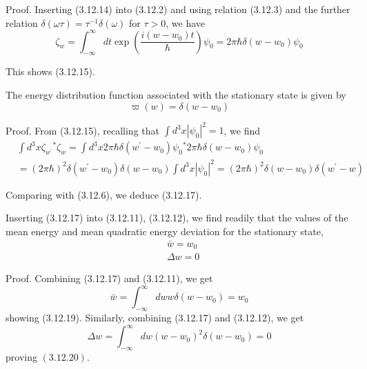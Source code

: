 \documentclass{article}
\begin{document}
Proof. Inserting (3.12.14) into (3.12.2) and using relation (3.12.3) and the further relation $\delta(\omega \tau)=\tau^{-1} \delta(\omega)$ for $\tau>0$, we have
$$
\begin{equation*}
\zeta_{w}=\int_{-\infty}^{\infty} d t \exp \left(\frac{i\left(w-w_{0}\right) t}{\hbar}\right) \psi_{0}=2 \pi \hbar \delta\left(w-w_{0}\right) \psi_{0} \tag{3.12.16}
\end{equation*}
$$

This shows (3.12.15).

The energy distribution function associated with the stationary state is given by
$$
\begin{equation*}
\varpi(w)=\delta\left(w-w_{0}\right) \tag{3.12.17}
\end{equation*}
$$

Proof. From (3.12.15), recalling that $\int d^{3} x\left|\psi_{0}\right|^{2}=1$, we find
$$
\begin{align*}
& \int d^{3} x \zeta_{w^{\prime}}{ }^{*} \zeta_{w}=\int d^{3} x 2 \pi \hbar \delta\left(w^{\prime}-w_{0}\right) \psi_{0}{ }^{*} 2 \pi \hbar \delta\left(w-w_{0}\right) \psi_{0}  \tag{3.12.18}\\
& =(2 \pi \hbar)^{2} \delta\left(w^{\prime}-w_{0}\right) \delta\left(w-w_{0}\right) \int d^{3} x\left|\psi_{0}\right|^{2}=(2 \pi \hbar)^{2} \delta\left(w-w_{0}\right) \delta\left(w^{\prime}-w\right)
\end{align*}
$$

Comparing with (3.12.6), we deduce (3.12.17).

Inserting (3.12.17) into (3.12.11), (3.12.12), we find readily that the values of the mean energy and mean quadratic energy deviation for the stationary state,
$$
\begin{align*}
& \bar{w}=w_{0}  \tag{3.12.19}\\
& \Delta w=0 \tag{3.12.20}
\end{align*}
$$

Proof. Combining (3.12.17) and (3.12.11), we get
$$
\begin{equation*}
\bar{w}=\int_{-\infty}^{\infty} d w w \delta\left(w-w_{0}\right)=w_{0} \tag{3.12.21}
\end{equation*}
$$
showing (3.12.19). Similarly, combining (3.12.17) and (3.12.12), we get
$$
\begin{equation*}
\Delta w=\int_{-\infty}^{\infty} d w\left(w-w_{0}\right)^{2} \delta\left(w-w_{0}\right)=0 \tag{3.12.22}
\end{equation*}
$$
proving $(3.12 .20)$.
\end{document}
